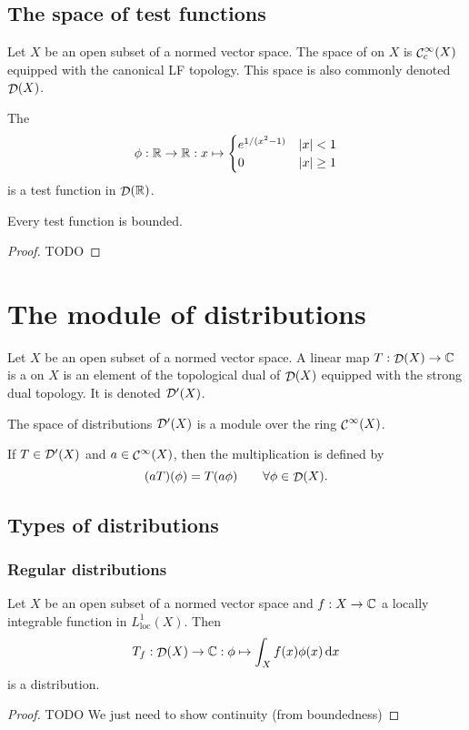 \subsection{The space of test functions}
\begin{definition}
Let $X$ be an open subset of a normed vector space. The space of  on $X$ is $\mathop{\mathcal{C}}^\infty_c(X)$ equipped with the canonical LF topology. This space is also commonly denoted $\mathop{\mathcal{D}}(X)$.
\end{definition}

\begin{example}
The 
\[ \phi: \mathbb{R}\to\mathbb{R}: x\mapsto \begin{cases}
e^{1/(x^2-1)} & |x|<1 \\ 0 & |x| \geq 1
\end{cases} \]
is a test function in $\mathop{\mathcal{D}}(\mathbb{R})$.
\end{example}

\begin{lemma}
Every test function is bounded.
\end{lemma}
\begin{proof}
TODO
\end{proof}

\section{The module of distributions}
\begin{definition}
    Let $X$ be an open subset of a normed vector space.
    A linear map $T: \mathop{\mathcal{D}}(X) \to \mathbb{C}$ is a  on $X$ is an element of the topological dual of $\mathop{\mathcal{D}}(X)$ equipped with the strong dual topology. It is denoted $\mathop{\mathcal{D}^\prime}(X)$.
\end{definition}

\begin{proposition}
    The space of distributions $\mathop{\mathcal{D}^\prime}(X)$ is a module over the ring $\mathop{\mathcal{C}}^\infty(X)$.
    
    If $T\in \mathop{\mathcal{D}^\prime}(X)$ and $a\in \mathop{\mathcal{C}}^\infty(X)$, then the multiplication is defined by
    \[ (aT)(\phi) = T(a\phi) \qquad \forall \phi \in \mathop{\mathcal{D}}(X). \]
\end{proposition}

\subsection{Types of distributions}
\subsubsection{Regular distributions}
\begin{lemma}
Let $X$ be an open subset of a normed vector space and $f: X\to\mathbb{C}$ a locally integrable function in $L^1_\text{loc}(X)$. Then
\[ T_f: \mathop{\mathcal{D}}(X) \to \mathbb{C}: \phi \mapsto \int_X f(x)\phi(x)\operatorname{d \!}{x} \]
is a distribution.
\end{lemma}
\begin{proof}
TODO We just need to show continuity (from boundedness)
\end{proof}

